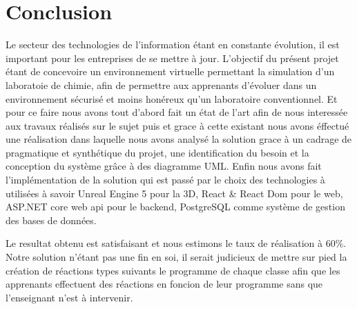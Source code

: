 \chapter*{Conclusion}

Le secteur des technologies de l’information étant en constante évolution, il est important pour les entreprises de se mettre à jour.
L’objectif du présent projet étant de concevoire un environnement virtuelle permettant la simulation d'un laboratoie de chimie, afin de permettre aux apprenants d'évoluer dans un environnement sécurisé et moins honéreux qu'un laboratoire conventionnel.
Et pour ce faire nous avons tout d'abord fait un état de l'art afin de nous interessée aux travaux réalisés sur le sujet puis et grace à cette existant nous avons éffectué une réalisation dans laquelle nous avons analysé la solution grace à un cadrage de pragmatique et synthétique du projet, une identification du besoin et la conception du système grâce à des diagramme UML. Enfin nous avons fait l'implémentation de la solution qui est passé par le choix des technologies à utilisées à savoir Unreal Engine 5 pour la 3D, React \& React Dom pour le web, ASP.NET core web api pour le backend, PostgreSQL comme système de gestion des bases de données.

Le resultat obtenu est satisfaisant et nous estimons le taux de réalisation à 60\%. Notre solution n'étant pas une fin en soi,  il serait judicieux de mettre sur pied la création de réactions types suivants le programme de chaque classe afin que les apprenants effectuent des réactions en foncion de leur programme sans que l'enseignant n'est à intervenir.